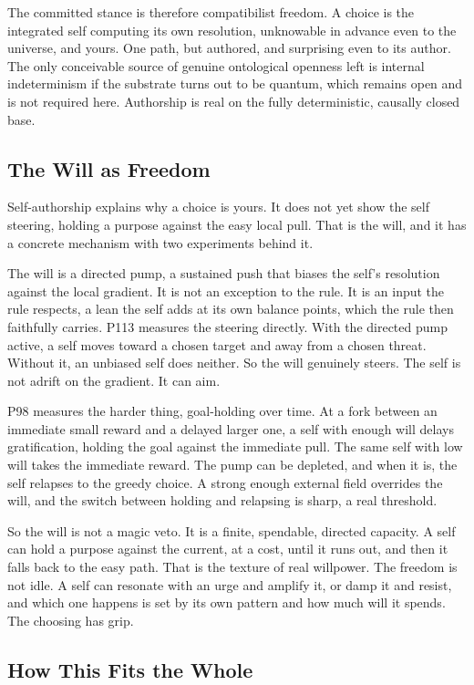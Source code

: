 The committed stance is therefore compatibilist freedom. A choice is the integrated self computing its own resolution, unknowable in advance even to the universe, and yours. One path, but authored, and surprising even to its author. The only conceivable source of genuine ontological openness left is internal indeterminism if the substrate turns out to be quantum, which remains open and is not required here. Authorship is real on the fully deterministic, causally closed base.

\subsection{The Will as Freedom}

Self-authorship explains why a choice is yours. It does not yet show the self steering, holding a purpose against the easy local pull. That is the will, and it has a concrete mechanism with two experiments behind it.

The will is a directed pump, a sustained push that biases the self's resolution against the local gradient. It is not an exception to the rule. It is an input the rule respects, a lean the self adds at its own balance points, which the rule then faithfully carries. P113 measures the steering directly. With the directed pump active, a self moves toward a chosen target and away from a chosen threat. Without it, an unbiased self does neither. So the will genuinely steers. The self is not adrift on the gradient. It can aim.

P98 measures the harder thing, goal-holding over time. At a fork between an immediate small reward and a delayed larger one, a self with enough will delays gratification, holding the goal against the immediate pull. The same self with low will takes the immediate reward. The pump can be depleted, and when it is, the self relapses to the greedy choice. A strong enough external field overrides the will, and the switch between holding and relapsing is sharp, a real threshold.

So the will is not a magic veto. It is a finite, spendable, directed capacity. A self can hold a purpose against the current, at a cost, until it runs out, and then it falls back to the easy path. That is the texture of real willpower. The freedom is not idle. A self can resonate with an urge and amplify it, or damp it and resist, and which one happens is set by its own pattern and how much will it spends. The choosing has grip.

\subsection{How This Fits the Whole}

